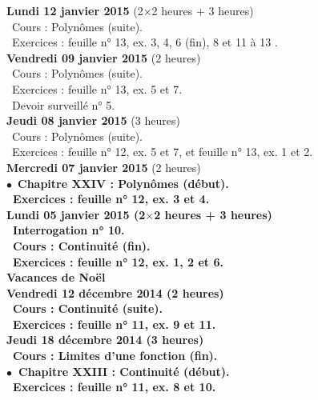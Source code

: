 \documentclass[12pt,a4paper]{article}
\begin{document}
\noindent\textbf{ Lundi 12 janvier 2015 \rm} (2$\times$2 heures + 3 heures)\\
\bu\ Cours : Polynômes (suite).\\
\bu\ Exercices : feuille n° 13, ex. 3, 4, 6 (fin), 8 et 11 à 13 .\vspace{.4cm}\\

\noindent\textbf{ \bf Vendredi 09 janvier 2015 \rm}(2 heures)\\
\bu\ Cours : Polynômes (suite).\\
\bu\ Exercices : feuille n° 13, ex. 5 et 7.\\
\bu\ Devoir surveillé n° 5.\vspace{.4cm}\\

\noindent\textbf{ \bf Jeudi 08 janvier 2015 \rm}(3 heures)\\
\bu\ Cours : Polynômes (suite).\\
\bu\ Exercices : feuille n° 12, ex. 5 et 7, et feuille n° 13, ex. 1 et 2.\vspace{.4cm}\\

\noindent\textbf{ Mercredi 07 janvier 2015 \rm} (2 heures)\\
$\bullet$\ \bf Chapitre XXIV \rm : Polynômes (début).\\
\bu\ Exercices : feuille n° 12, ex. 3 et 4.\vspace{.4cm}\\

\noindent\textbf{ Lundi 05 janvier 2015 \rm} (2$\times$2 heures + 3 heures)\\
\bu\ Interrogation n° 10.\\
\bu\ Cours : Continuité (fin).\\
\bu\ Exercices : feuille n° 12, ex. 1, 2 et 6.\vspace{.4cm}\\

 
\noindent\textbf{\bf Vacances de Noël \rm}\\

\noindent\textbf{ \bf Vendredi 12 décembre 2014 \rm}(2 heures)\\
\bu\ Cours : Continuité (suite).\\
\bu\ Exercices : feuille n° 11, ex. 9 et 11.\vspace{.4cm}\\

\noindent\textbf{ \bf Jeudi 18 décembre 2014 \rm}(3 heures)\\
\bu\ Cours : Limites d'une fonction (fin).\\
$\bullet$\ \bf Chapitre XXIII \rm : Continuité (début).\\
\bu\ Exercices : feuille n° 11, ex. 8 et 10.\vspace{.4cm}\\
\end{document}
